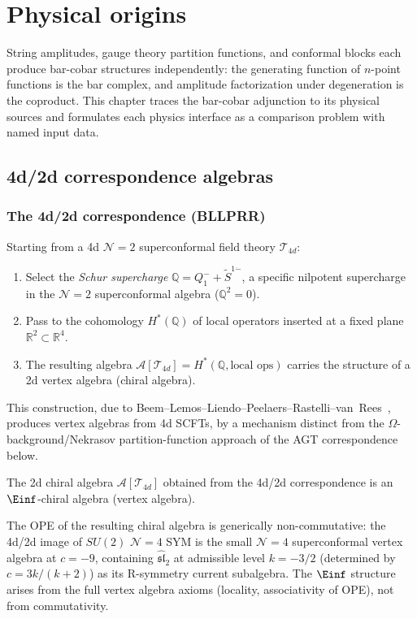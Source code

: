 \chapter{Physical origins}

String amplitudes, gauge theory partition functions, and conformal
blocks each produce bar-cobar structures independently: the
generating function of $n$-point functions is the bar complex, and
amplitude factorization under degeneration is the coproduct.
This chapter traces the bar-cobar adjunction to its physical sources
and formulates each physics interface as a comparison problem with
named input data.

\section{4d/2d correspondence algebras}

\subsection{The 4d/2d correspondence (BLLPRR)}

\begin{construction}
Starting from a 4d $\mathcal{N} = 2$ superconformal field theory $\mathcal{T}_{4d}$:
\begin{enumerate}[label=(\roman*)]
\item Select the \emph{Schur supercharge} $\mathbb{Q} = Q_1^- + \widetilde{S}^{1\dot{-}}$, a specific nilpotent supercharge in the $\mathcal{N}=2$ superconformal algebra ($\mathbb{Q}^2 = 0$).
\item Pass to the cohomology $H^*(\mathbb{Q})$ of local operators inserted at a fixed plane $\mathbb{R}^2 \subset \mathbb{R}^4$.
\item The resulting algebra $\mathcal{A}[\mathcal{T}_{4d}] = H^*(\mathbb{Q}, \text{local ops})$ carries the structure of a 2d vertex algebra (chiral algebra).
\end{enumerate}

This construction, due to Beem--Lemos--Liendo--Peelaers--Rastelli--van~Rees~\cite{beem-et-al}, produces vertex algebras from 4d SCFTs, by a mechanism distinct from the $\Omega$-background/Nekrasov partition-function
approach of the AGT correspondence below.
\end{construction}

\begin{theorem}
The 2d chiral algebra $\mathcal{A}[\mathcal{T}_{4d}]$ obtained from the 4d/2d
correspondence is an $\Einf$-chiral algebra (vertex algebra).

The OPE of the resulting chiral algebra is generically non-commutative: the 4d/2d image of $SU(2)$ $\mathcal{N}=4$ SYM is the small $\mathcal{N}=4$ superconformal vertex algebra at $c = -9$, containing $\widehat{\mathfrak{sl}}_2$ at admissible level $k = -3/2$ (determined by $c = 3k/(k+2)$) as its R-symmetry current subalgebra. The $\Einf$ structure arises from the full vertex algebra axioms (locality, associativity of OPE), not from commutativity.
\end{theorem}

